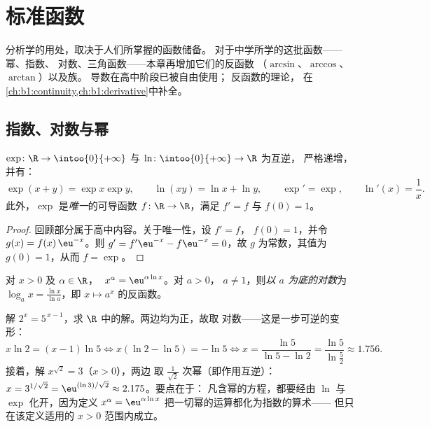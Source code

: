 \chapter{标准函数}\label{ch:b1:functions}

分析学的用处，取决于人们所掌握的函数储备。
对于中学所学的这批函数——幂、指数、
对数、三角函数——本章再增加它们的反函数
（$\arcsin$、$\arccos$、$\arctan$）以及族。
导数在高中阶段已被自由使用；
反函数的理论，
在\cref{ch:b1:continuity,ch:b1:derivative}中补全。

\section{指数、对数与幂}

\begin{proposition}[回顾与刻画]\label{prop:b1:functions:expln}
$\exp \colon \R \to \intoo{0}{+\infty}$ 与 $\ln \colon
\intoo{0}{+\infty} \to \R$ 为互逆，
严格递增，并有：
\[
\exp(x + y) = \exp x \exp y, \qquad \ln(xy) = \ln x + \ln y,
\qquad \exp' = \exp, \qquad \ln'(x) = \frac 1x .
\]
此外，$\exp$ 是\emph{唯一}的可导函数 $f \colon
\R \to \R$，满足 $f' = f$ 与 $f(0) = 1$。
\end{proposition}

\begin{proof}
回顾部分属于高中内容。关于唯一性，设 $f' = f$，
$f(0) = 1$，并令 $g(x) = f(x)\,\eu^{-x}$。则 $g' = f'\eu^{-x} -
f\eu^{-x} = 0$，故 $g$ 为常数，其值为 $g(0) = 1$，从而 $f = \exp$。
\end{proof}

\begin{definition}[一般幂]\label{def:b1:functions:powers}
对 $x > 0$ 及 $\alpha \in \R$，
$\;x^\alpha = \eu^{\alpha \ln x}$。对 $a > 0$，
$a \neq 1$，则\emph{以 $a$ 为底的对数}为 $\log_a x =
\frac{\ln x}{\ln a}$，即 $x \mapsto a^x$ 的反函数。
\end{definition}

\begin{example}[解指数方程]\label{ex:b1:functions:expequations}
解 $2^x = 5^{\,x-1}$，求 $\R$ 中的解。两边均为正，故取
对数——这是一步可逆的变形：
\[
x\ln2 = (x - 1)\ln5
\iff x(\ln2 - \ln5) = -\ln5
\iff x = \frac{\ln5}{\ln5 - \ln2} = \frac{\ln 5}{\ln\frac52}
\approx 1.756 .
\]
接着，解 $x^{\sqrt2} = 3$（$x > 0$），两边
取 $\frac1{\sqrt2}$ 次幂（即作用互逆）：
$x = 3^{1/\sqrt2} = \eu^{(\ln 3)/\sqrt2} \approx 2.175$。要点在于：
凡含幂的方程，都要经由 $\ln$ 与
$\exp$ 化开，因为定义 $x^\alpha = \eu^{\alpha\ln x}$
把一切幂的运算都化为指数的算术——
但只在该定义适用的 $x > 0$ 范围内成立。
\end{example}

